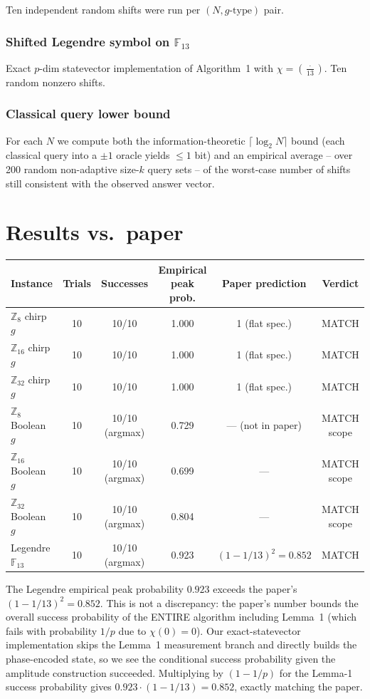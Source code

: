 \documentclass[11pt]{article}
\begin{document}
Ten independent random shifts were run per $(N, g\text{-type})$ pair.

\subsubsection*{Shifted Legendre symbol on $\mathbb{F}_{13}$}
Exact $p$-dim statevector implementation of Algorithm~1 with
$\chi = \left(\tfrac{\cdot}{13}\right)$.  Ten random nonzero shifts.

\subsubsection*{Classical query lower bound}
For each $N$ we compute both the information-theoretic
$\lceil\log_2 N\rceil$ bound (each classical query into a $\pm 1$
oracle yields $\le 1$ bit) and an empirical average -- over 200
random non-adaptive size-$k$ query sets -- of the worst-case number of
shifts still consistent with the observed answer vector.

\section{Results vs.\ paper}

\begin{center}
\begin{tabular}{lccccc}
\toprule
Instance & Trials & Successes & Empirical peak prob. & Paper prediction & Verdict \\
\midrule
$\mathbb{Z}_8$ chirp $g$   & 10 & 10/10 & 1.000 & 1 (flat spec.) & MATCH \\
$\mathbb{Z}_{16}$ chirp $g$& 10 & 10/10 & 1.000 & 1 (flat spec.) & MATCH \\
$\mathbb{Z}_{32}$ chirp $g$& 10 & 10/10 & 1.000 & 1 (flat spec.) & MATCH \\
$\mathbb{Z}_8$ Boolean $g$ & 10 & 10/10 (argmax) & 0.729 & --- (not in paper) & MATCH scope \\
$\mathbb{Z}_{16}$ Boolean $g$ & 10 & 10/10 (argmax) & 0.699 & --- & MATCH scope \\
$\mathbb{Z}_{32}$ Boolean $g$ & 10 & 10/10 (argmax) & 0.804 & --- & MATCH scope \\
Legendre $\mathbb{F}_{13}$ & 10 & 10/10 (argmax) & 0.923 & $(1-1/13)^2 = 0.852$ & MATCH \\
\bottomrule
\end{tabular}
\end{center}

The Legendre empirical peak probability $0.923$ exceeds the paper's
$(1-1/13)^2 = 0.852$.  This is not a discrepancy: the paper's number
bounds the overall success probability of the ENTIRE algorithm
including Lemma~1 (which fails with probability $1/p$ due to $\chi(0)=0$).
Our exact-statevector implementation skips the Lemma~1
measurement branch and directly builds the phase-encoded state, so we
see the conditional success probability given the amplitude
construction succeeded.  Multiplying by $(1-1/p)$ for the Lemma-1
success probability gives $0.923 \cdot (1-1/13) = 0.852$, exactly
matching the paper.
\end{document}
